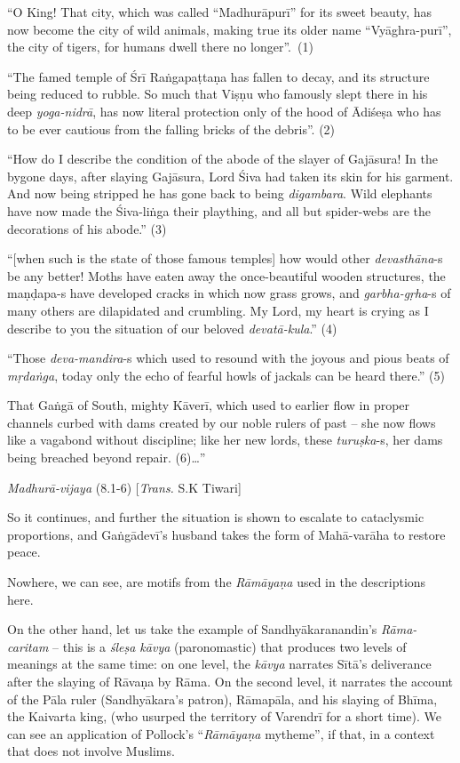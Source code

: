 \begin{myquote}
“O King! That city, which was called “Madhurāpurī” for its sweet beauty, has now become the city of wild animals, making true its older name “Vyāghra-purī”, the city of tigers, for humans dwell there no longer”.~(1) 

“The famed temple of Śrī Raṅgapaṭtaṇa has fallen to decay, and its structure being reduced to rubble. So much that Viṣṇu who famously slept there in his deep {\sl yoga-nidrā}, has now literal protection only of the hood of Ādiśeṣa who has to be ever cautious from the falling bricks of the debris”. (2) 

“How do I describe the condition of the abode of the slayer of Gajāsura! In the bygone days, after slaying Gajāsura, Lord Śiva had taken its skin for his garment. And now being stripped he has gone back to being {\sl digambara}. Wild elephants have now made the Śiva-liṅga their plaything, and all but spider-webs are the decorations of his abode.” (3) 

“[when such is the state of those famous temples] how would other {\sl devasthāna}-s be any better! Moths have eaten away the once-beautiful wooden structures, the maṇḍapa-s have developed cracks in which now grass grows, and {\sl garbha-gṛha}-s of many others are dilapidated and crumbling. My Lord, my heart is crying as I describe to you the situation of our beloved {\sl devatā-kula}.” (4) 

“Those {\sl deva-mandira}-s which used to resound with the joyous and pious beats of {\sl mṛdaṅga}, today only the echo of fearful howls of jackals can be heard there.” (5) 

That Gaṅgā of South, mighty Kāverī, which used to earlier flow in proper channels curbed with dams created by our noble rulers of past – she now flows like a vagabond without discipline; like her new lords, these {\sl turuṣka}-s, her dams being breached beyond repair. (6)…” 

\hfill {\sl Madhurā-vijaya} (8.1-6) [{\sl Trans.} S.K  Tiwari]
\end{myquote}

So it continues, and further the situation is shown to escalate to cataclysmic proportions, and Gaṅgādevī’s husband takes the form of Mahā-varāha to restore peace. 

Nowhere, we can see, are motifs from the {\sl Rāmāyaṇa} used in the descriptions here.  

On the other hand, let us take the example of Sandhyākaranandin's {\sl Rāma-caritam} – this is a {\sl śleṣa kāvya} (paronomastic) that produces two levels of meanings at the same time: on one level, the {\sl kāvya} narrates Sītā’s deliverance after the slaying of Rāvaṇa by Rāma.  On the second level, it narrates the account of the Pāla ruler (Sandhyākara’s patron), Rāmapāla, and his slaying of Bhīma, the Kaivarta king, (who usurped the territory of Varendrī for a short time). We can see an application of Pollock’s “{\sl Rāmāyaṇa} mytheme”, if that, in a context that does not involve Muslims. 

